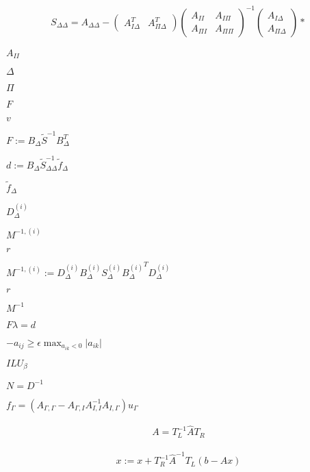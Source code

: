 \documentclass{article}
\begin{document}
\begin{align*} S_{\Delta \Delta} = A_{\Delta \Delta} - \begin{pmatrix} A_{I \Delta}^T & A_{\Pi \Delta}^T \end{pmatrix} \begin{pmatrix} A_{II} & A_{I \Pi} \\ A_{\Pi I} & A_{\Pi \Pi} \end{pmatrix}^{-1} \begin{pmatrix} A_{I \Delta} \\ A_{\Pi \Delta} \end{pmatrix} * \end{align*}
\pagebreak

$A_{II}$
\pagebreak

$\Delta$
\pagebreak

$\Pi$
\pagebreak

$F$
\pagebreak

$v$
\pagebreak

$F := B_{\Delta} \tilde{S}^{-1} B_{\Delta}^T$
\pagebreak

$d := B_{\Delta} \tilde{S}_{\Delta \Delta}^{-1} \tilde{f}_{\Delta}$
\pagebreak

$\tilde{f}_{\Delta}$
\pagebreak

$D_{\Delta}^{(i)}$
\pagebreak

$ M^{-1,(i)} $
\pagebreak

$ r $
\pagebreak

$M^{-1,(i)} := D_{\Delta}^{(i)} B_{\Delta}^{(i)} S_{\Delta}^{(i)} {B_{\Delta}^{(i)}}^T D_{\Delta}^{(i)}$
\pagebreak

$r$
\pagebreak

$ M^{-1} $
\pagebreak

$F \lambda = d$
\pagebreak

$ -a_{ij} \ge \epsilon \max_{a_{ik}<0} |a_{ik}| $
\pagebreak

$ ILU_{\beta} $
\pagebreak

$ N = D^{-1} $
\pagebreak

$ f_{\Gamma} = (A_{\Gamma, \Gamma} - A_{\Gamma, I} A_{I, I}^{-1} A_{I, \Gamma} )u_{\Gamma} $
\pagebreak

\begin{eqnarray*} A = T_L^{-1} \hat{A} T_R \end{eqnarray*}
\pagebreak

\begin{eqnarray*} x := x + T_R^{-1} {\hat{A}}^{-1} T_L (b-Ax) \end{eqnarray*}
\pagebreak
\end{document}
